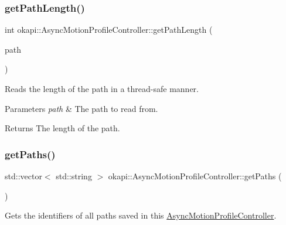 \mbox{\label{classokapi_1_1AsyncMotionProfileController_af14f6b6c201a7b80c32f5fc14c11022f}} 
\subsubsection{\texorpdfstring{getPathLength()}{getPathLength()}}
{\footnotesize\ttfamily int okapi\+::\+Async\+Motion\+Profile\+Controller\+::get\+Path\+Length (\begin{DoxyParamCaption}\item[{const \mbox{\hyperlink{structokapi_1_1AsyncMotionProfileController_1_1TrajectoryPair}{Trajectory\+Pair}} \&}]{path }\end{DoxyParamCaption})\hspace{0.3cm}{\ttfamily [protected]}}

Reads the length of the path in a thread-\/safe manner.


\begin{DoxyParams}{Parameters}
{\em path} & The path to read from. \\
\hline
\end{DoxyParams}
\begin{DoxyReturn}{Returns}
The length of the path. 
\end{DoxyReturn}
\mbox{\label{classokapi_1_1AsyncMotionProfileController_a5853ae5af552cf56f36c9563733c6ace}} 
\subsubsection{\texorpdfstring{getPaths()}{getPaths()}}
{\footnotesize\ttfamily std\+::vector$<$ std\+::string $>$ okapi\+::\+Async\+Motion\+Profile\+Controller\+::get\+Paths (\begin{DoxyParamCaption}{ }\end{DoxyParamCaption})}

Gets the identifiers of all paths saved in this {\ttfamily \mbox{\hyperlink{classokapi_1_1AsyncMotionProfileController}{Async\+Motion\+Profile\+Controller}}}.


